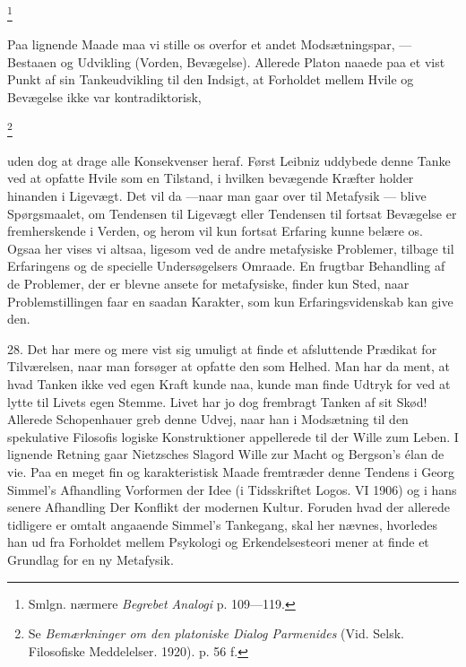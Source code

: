 \documentclass[12pt]{article}
\newcommand{\apage}[1]{\marginnote{\footnotesize\textit{[#1]}}}
\begin{document}
         \footnote{Smlgn. nærmere\textit{ Begrebet Analogi} p. 109---119.}

Paa lignende Maade maa vi stille os overfor et andet Modsætningspar, ---
Bestaaen og Udvikling (Vorden, Bevægelse). Allerede Platon naaede paa et vist
Punkt af sin Tankeudvikling til den Indsigt, at Forholdet mellem Hvile og
Bevægelse ikke var kontradiktorisk,

         \footnote{Se \textit{Bemærkninger om den platoniske Dialog Parmenides}
(Vid. Selsk. Filosofiske Meddelelser. 1920). p. 56 f.}

       uden dog at drage alle Konsekvenser heraf. Først Leibniz uddybede denne
Tanke ved at opfatte Hvile som en Tilstand, i hvilken bevægende Kræfter holder
hinanden i Ligevægt. Det vil da ---naar man gaar over til Metafysik --- blive
Spørgsmaalet, om Tendensen til Ligevægt eller Tendensen til fortsat Bevægelse
er fremherskende i Verden, og herom vil kun fortsat Erfaring kunne belære os.
Ogsaa her vises vi altsaa, ligesom ved de andre metafysiske Problemer, tilbage
til Erfaringens og de specielle Undersøgelsers Omraade. En frugtbar Behandling
af de Problemer, der er blevne ansete for
\guillemotright{}metafysiske\guillemotleft{}, finder kun Sted, naar
Problemstillingen faar en saadan Karakter, som kun Erfaringsvidenskab kan give den.

\setcounter{footnote}{0}%
\apage{92}28. Det har mere og mere vist sig umuligt at finde et afsluttende
Prædikat for Tilværelsen, naar man forsøger at opfatte den som Helhed. Man har
da ment, at hvad Tanken ikke ved egen Kraft kunde naa, kunde man finde Udtryk
for ved at lytte til Livets egen Stemme. Livet har jo dog frembragt Tanken af
sit Skød! Allerede Schopenhauer greb denne Udvej, naar han i Modsætning til den
spekulative Filosofis logiske Konstruktioner appellerede til
\guillemotright{}der Wille zum Leben\guillemotleft{}. I lignende Retning gaar
Nietzsches Slagord \guillemotright{}Wille zur Macht\guillemotleft{} og
Bergson's \guillemotright{}élan de vie\guillemotleft{}. Paa en meget fin og
karakteristisk Maade fremtræder denne Tendens i Georg Simmel's Afhandling
\guillemotright{}Vorformen der Idee\guillemotleft{} (i Tidsskriftet Logos. VI
1906) og i hans senere Afhandling \guillemotright{}Der Konflikt der modernen
Kultur\guillemotleft{}. Foruden hvad der allerede tidligere er omtalt angaaende
Simmel's Tankegang, skal her nævnes, hvorledes han ud fra Forholdet mellem
Psykologi og Erkendelsesteori mener at finde et Grundlag for en ny Metafysik.
\end{document}
